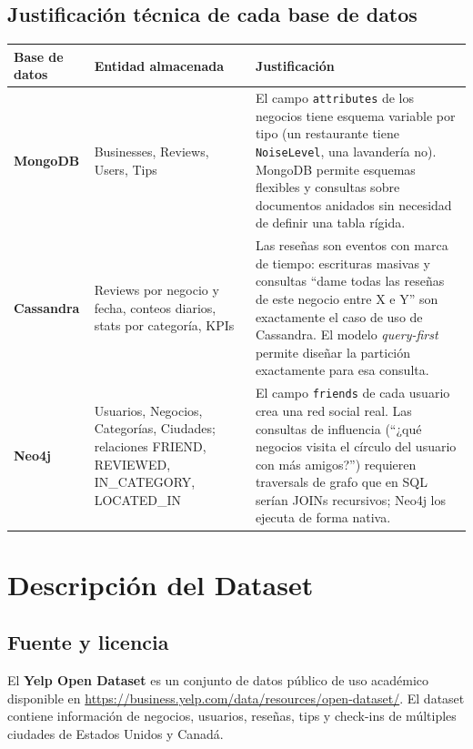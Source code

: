 \documentclass[12pt,a4paper]{article}
\begin{document}
\subsection{Justificación técnica de cada base de datos}

\begin{longtable}{>{\bfseries}p{2.8cm} p{5cm} p{6cm}}
\toprule
Base de datos & Entidad almacenada & Justificación \\
\midrule
\textcolor{monggreen}{MongoDB} &
Businesses, Reviews, Users, Tips &
El campo \texttt{attributes} de los negocios tiene esquema variable por tipo (un restaurante tiene \texttt{NoiseLevel}, una lavandería no). MongoDB permite esquemas flexibles y consultas sobre documentos anidados sin necesidad de definir una tabla rígida. \\[0.4em]

\textcolor{cassblue}{Cassandra} &
Reviews por negocio y fecha, conteos diarios, stats por categoría, KPIs &
Las reseñas son eventos con marca de tiempo: escrituras masivas y consultas ``dame todas las reseñas de este negocio entre X e Y'' son exactamente el caso de uso de Cassandra. El modelo \textit{query-first} permite diseñar la partición exactamente para esa consulta. \\[0.4em]

\textcolor{neo4jpurple}{Neo4j} &
Usuarios, Negocios, Categorías, Ciudades; relaciones FRIEND, REVIEWED, IN\_CATEGORY, LOCATED\_IN &
El campo \texttt{friends} de cada usuario crea una red social real. Las consultas de influencia (``¿qué negocios visita el círculo del usuario con más amigos?'') requieren traversals de grafo que en SQL serían JOINs recursivos; Neo4j los ejecuta de forma nativa. \\
\bottomrule
\end{longtable}

\section{Descripción del Dataset}

\subsection{Fuente y licencia}

El \textbf{Yelp Open Dataset} es un conjunto de datos público de uso académico disponible
en \url{https://business.yelp.com/data/resources/open-dataset/}. El dataset contiene
información de negocios, usuarios, reseñas, tips y check-ins de múltiples ciudades de
Estados Unidos y Canadá.
\end{document}
